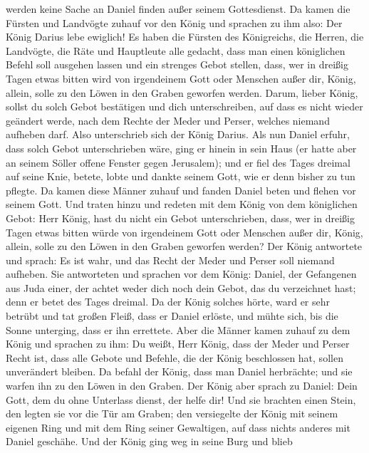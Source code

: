 werden keine Sache an Daniel finden außer seinem Gottesdienst.
 Da kamen die Fürsten und Landvögte zuhauf vor den König und
sprachen zu ihm also: Der König Darius lebe ewiglich!  Es
haben die Fürsten des Königreichs, die Herren, die Landvögte, die Räte
und Hauptleute alle gedacht, dass man einen königlichen Befehl soll
ausgehen lassen und ein strenges Gebot stellen, dass, wer in dreißig
Tagen etwas bitten wird von irgendeinem Gott oder Menschen außer dir,
König, allein, solle zu den Löwen in den Graben geworfen werden.
 Darum, lieber König, sollst du solch Gebot bestätigen und
dich unterschreiben, auf dass es nicht wieder geändert werde, nach dem
Rechte der Meder und Perser, welches niemand aufheben darf.
 Also unterschrieb sich der König Darius.  Als
nun Daniel erfuhr, dass solch Gebot unterschrieben wäre, ging er hinein
in sein Haus (er hatte aber an seinem Söller offene Fenster gegen
Jerusalem); und er fiel des Tages dreimal auf seine Knie, betete, lobte
und dankte seinem Gott, wie er denn bisher zu tun pflegte. 
Da kamen diese Männer zuhauf und fanden Daniel beten und flehen vor
seinem Gott.  Und traten hinzu und redeten mit dem König
von dem königlichen Gebot: Herr König, hast du nicht ein Gebot
unterschrieben, dass, wer in dreißig Tagen etwas bitten würde von
irgendeinem Gott oder Menschen außer dir, König, allein, solle zu den
Löwen in den Graben geworfen werden? Der König antwortete und sprach: Es
ist wahr, und das Recht der Meder und Perser soll niemand aufheben.
 Sie antworteten und sprachen vor dem König: Daniel, der
Gefangenen aus Juda einer, der achtet weder dich noch dein Gebot, das du
verzeichnet hast; denn er betet des Tages dreimal.  Da der
König solches hörte, ward er sehr betrübt und tat großen Fleiß, dass er
Daniel erlöste, und mühte sich, bis die Sonne unterging, dass er ihn
errettete.  Aber die Männer kamen zuhauf zu dem König und
sprachen zu ihm: Du weißt, Herr König, dass der Meder und Perser Recht
ist, dass alle Gebote und Befehle, die der König beschlossen hat, sollen
unverändert bleiben.  Da befahl der König, dass man Daniel
herbrächte; und sie warfen ihn zu den Löwen in den Graben. Der König
aber sprach zu Daniel: Dein Gott, dem du ohne Unterlass dienst, der
helfe dir!  Und sie brachten einen Stein, den legten sie
vor die Tür am Graben; den versiegelte der König mit seinem eigenen Ring
und mit dem Ring seiner Gewaltigen, auf dass nichts anderes mit Daniel
geschähe.  Und der König ging weg in seine Burg und blieb
